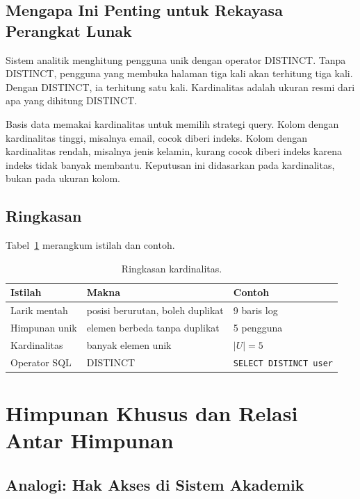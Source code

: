 \documentclass[11pt,a4paper]{article}
\begin{document}
\subsection{Mengapa Ini Penting untuk Rekayasa Perangkat Lunak}

Sistem analitik menghitung pengguna unik dengan operator DISTINCT. Tanpa DISTINCT, pengguna yang membuka halaman tiga kali akan terhitung tiga kali. Dengan DISTINCT, ia terhitung satu kali. Kardinalitas adalah ukuran resmi dari apa yang dihitung DISTINCT.

Basis data memakai kardinalitas untuk memilih strategi query. Kolom dengan kardinalitas tinggi, misalnya email, cocok diberi indeks. Kolom dengan kardinalitas rendah, misalnya jenis kelamin, kurang cocok diberi indeks karena indeks tidak banyak membantu. Keputusan ini didasarkan pada kardinalitas, bukan pada ukuran kolom.

\subsection{Ringkasan}

Tabel~\ref{tab:kardinalitas} merangkum istilah dan contoh.

\begin{table}[H]
	\centering
	\caption{Ringkasan kardinalitas.}
	\label{tab:kardinalitas}
	\small
	\begin{tabularx}{\textwidth}{l X X}
		\toprule
		Istilah       & Makna                            & Contoh                        \\
		\midrule
		Larik mentah  & posisi berurutan, boleh duplikat & 9 baris log                   \\
		Himpunan unik & elemen berbeda tanpa duplikat    & 5 pengguna                    \\
		Kardinalitas  & banyak elemen unik               & $|U|=5$                       \\
		Operator SQL  & DISTINCT                         & \texttt{SELECT DISTINCT user} \\
		\bottomrule
	\end{tabularx}
\end{table}

\section{Himpunan Khusus dan Relasi Antar Himpunan}

\subsection{Analogi: Hak Akses di Sistem Akademik}
\end{document}
